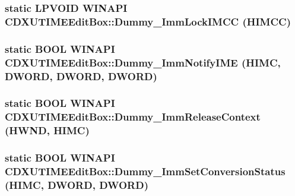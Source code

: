 \label{class_c_d_x_u_t_i_m_e_edit_box_a0251f6c7891e81c331f93217805ef9c0}
\hypertarget{class_c_d_x_u_t_i_m_e_edit_box_a3c14311c66c4a77d5b621192fe54f3b0}{
\subsubsection[{Dummy\_\-ImmLockIMCC}]{\setlength{\rightskip}{0pt plus 5cm}static {\bf LPVOID} WINAPI CDXUTIMEEditBox::Dummy\_\-ImmLockIMCC (HIMCC)}}
\label{class_c_d_x_u_t_i_m_e_edit_box_a3c14311c66c4a77d5b621192fe54f3b0}
\hypertarget{class_c_d_x_u_t_i_m_e_edit_box_ac1aa6446ec3d96e8dd281a66d99d2aea}{
\subsubsection[{Dummy\_\-ImmNotifyIME}]{\setlength{\rightskip}{0pt plus 5cm}static {\bf BOOL} WINAPI CDXUTIMEEditBox::Dummy\_\-ImmNotifyIME ({\bf HIMC}, \/  {\bf DWORD}, \/  {\bf DWORD}, \/  {\bf DWORD})}}
\label{class_c_d_x_u_t_i_m_e_edit_box_ac1aa6446ec3d96e8dd281a66d99d2aea}
\hypertarget{class_c_d_x_u_t_i_m_e_edit_box_a9b878886ec372fd37be7ec1d9fcf448f}{
\subsubsection[{Dummy\_\-ImmReleaseContext}]{\setlength{\rightskip}{0pt plus 5cm}static {\bf BOOL} WINAPI CDXUTIMEEditBox::Dummy\_\-ImmReleaseContext (HWND, \/  {\bf HIMC})}}
\label{class_c_d_x_u_t_i_m_e_edit_box_a9b878886ec372fd37be7ec1d9fcf448f}
\hypertarget{class_c_d_x_u_t_i_m_e_edit_box_a4fbcb1ed6d0f08f1a2149e86af71c8a6}{
\subsubsection[{Dummy\_\-ImmSetConversionStatus}]{\setlength{\rightskip}{0pt plus 5cm}static {\bf BOOL} WINAPI CDXUTIMEEditBox::Dummy\_\-ImmSetConversionStatus ({\bf HIMC}, \/  {\bf DWORD}, \/  {\bf DWORD})}}
